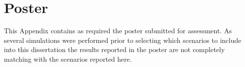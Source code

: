 \documentclass[12pt,a4paper,twoside]{report}
\renewcommand{\bibname}{References}
\begin{document}
\renewcommand{\bibname}{References}






\setcounter{tocdepth}{2}
\tableofcontents
\setlength{\parskip}{0.75ex plus0.1ex minus0.2ex}

\setcounter{page}{1}
\fancyhead{}
\fancyfoot{}
\pagestyle{fancy} 
\fancyhead[RO,LE]{\sffamily\small \thepage}
\fancyhead[LO,RE]{\sffamily\small \nouppercase{\rightmark}}

\setlength{\headheight}{14pt} 








\clearpage




\clearpage
\appendix







\chapter{Poster}
This Appendix contains as required the poster submitted for assessment. As several simulations were performed prior to selecting which scenarios to include into this dissertation the results reported in the poster are not completely matching with the scenarios reported here.


\end{document}
